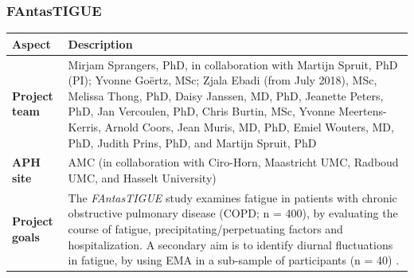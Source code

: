 \documentclass[]{book}
\begin{document}
\subsubsection{FAntasTIGUE}\label{fantastigue}

 

\begin{longtable}[]{@{}ll@{}}
\toprule
\begin{minipage}[b]{0.25\columnwidth}\raggedright\strut
\textbf{Aspect}\strut
\end{minipage} & \begin{minipage}[b]{0.69\columnwidth}\raggedright\strut
\textbf{Description}\strut
\end{minipage}\tabularnewline
\midrule
\endhead
\begin{minipage}[t]{0.25\columnwidth}\raggedright\strut
\textbf{Project team}\strut
\end{minipage} & \begin{minipage}[t]{0.69\columnwidth}\raggedright\strut
Mirjam Sprangers, PhD, in collaboration with Martijn Spruit, PhD (PI);
Yvonne Goërtz, MSc; Zjala Ebadi (from July 2018), MSc, Melissa Thong,
PhD, Daisy Janssen, MD, PhD, Jeanette Peters, PhD, Jan Vercoulen, PhD,
Chris Burtin, MSc, Yvonne Meertens-Kerris, Arnold Coors, Jean Muris, MD,
PhD, Emiel Wouters, MD, PhD, Judith Prins, PhD, and Martijn Spruit,
PhD\strut
\end{minipage}\tabularnewline
\begin{minipage}[t]{0.25\columnwidth}\raggedright\strut
\textbf{APH site}\strut
\end{minipage} & \begin{minipage}[t]{0.69\columnwidth}\raggedright\strut
AMC (in collaboration with Ciro-Horn, Maastricht UMC, Radboud UMC, and
Hasselt University)\strut
\end{minipage}\tabularnewline
\begin{minipage}[t]{0.25\columnwidth}\raggedright\strut
\textbf{Project goals}\strut
\end{minipage} & \begin{minipage}[t]{0.69\columnwidth}\raggedright\strut
The \emph{FAntasTIGUE} study examines fatigue in patients with chronic
obstructive pulmonary disease (COPD; n = 400), by evaluating the course
of fatigue, precipitating/perpetuating factors and hospitalization. A
secondary aim is to identify diurnal fluctuations in fatigue, by using
EMA in a sub-sample of participants (n = 40) \citep{Goertz2018}.\strut
\end{minipage}\tabularnewline

\end{longtable}
\end{document}

